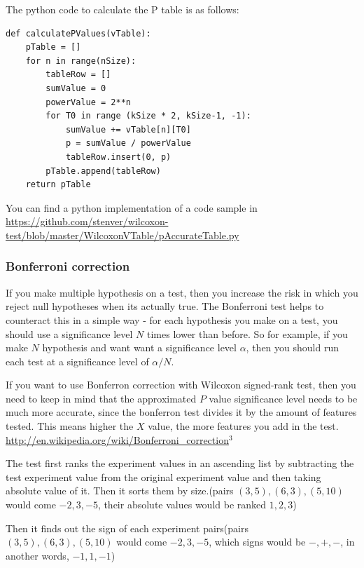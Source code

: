 \documentclass[12pt]{article}
\begin{document}
The python code to calculate the P table is as follows:

\begin{verbatim}
def calculatePValues(vTable):
    pTable = []
    for n in range(nSize):
        tableRow = []
        sumValue = 0
        powerValue = 2**n
        for T0 in range (kSize * 2, kSize-1, -1):
            sumValue += vTable[n][T0]
            p = sumValue / powerValue
            tableRow.insert(0, p)
        pTable.append(tableRow)
    return pTable

\end{verbatim}

You can find a python implementation of a code sample in
\url{https://github.com/stenver/wilcoxon-test/blob/master/WilcoxonVTable/pAccurateTable.py}

\subsubsection{Bonferroni correction}

If you make multiple hypothesis on a test, then you increase the risk in which you reject null hypotheses when its actually true. The Bonferroni test helps to counteract this in a simple way - for each hypothesis you make on a test, you should use a significance level $N$ times lower than before. So for example, if you make $N$ hypothesis and want want a significance level $α$,  then you should run each test at a significance level of $α/N$.

If you want to use Bonferron correction with Wilcoxon signed-rank test, then you need to keep in mind that the approximated $P$ value significance level needs to be much more accurate, since the bonferron test divides it by the amount of features tested. This means higher the $X$ value, the more features you add in the test. \url{http://en.wikipedia.org/wiki/Bonferroni_correction}$^3$


The test first ranks the experiment values in an ascending list by subtracting the test experiment value from the original experiment value and then taking absolute value of it. Then it sorts them by size.(pairs $(3, 5), (6, 3), (5, 10)$ would come $-2, 3, -5$, their absolute values would be ranked $1, 2, 3$)

Then it finds out the sign of each experiment pairs(pairs $(3, 5), (6, 3), (5, 10)$ would come $-2, 3, -5$, which signs would be $-, +, -$, in another words, $-1, 1, -1$)
\end{document}
